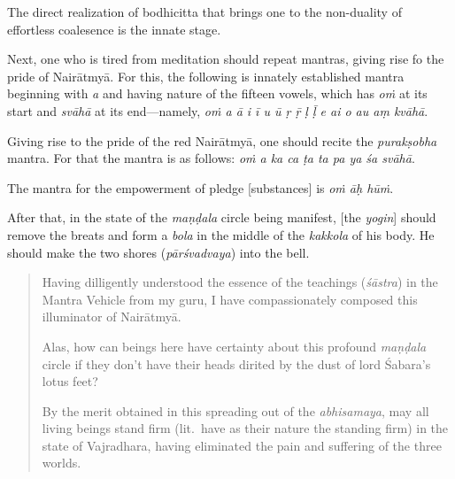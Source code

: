 \documentclass[naipra.tex]{subfiles}
\begin{document}
The direct realization of bodhicitta that brings one to the non-duality of effortless coalesence is the innate stage. 

Next, one who is tired from meditation should repeat mantras, giving rise fo the pride of Nairātmyā.
For this, the following is innately established mantra beginning with \emph{a} and having nature of the fifteen vowels, which has \emph{oṁ} at its start and \emph{svāhā} at its end—namely, \emph{oṁ a ā i ī u ū ṛ ṝ ḷ ḹ e ai o au aṃ kvāhā}.

Giving rise to the pride of the red Nairātmyā, one should recite the \emph{purakṣobha} mantra.
For that the mantra is as follows: \emph{oṁ a ka ca ṭa ta pa ya śa svāhā}.

The mantra for the empowerment of pledge [substances] is \emph{oṁ āḥ hūṁ}.

After that, in the state of the \emph{maṇḍala} circle being manifest, [the \emph{yogin}] should remove the breats and form a \emph{bola} in the middle of the \emph{kakkola} of his body.
He should make the two shores (\emph{pārśvadvaya}) into the bell.

\begin{quote}
	Having dilligently understood the essence of the teachings (\emph{śāstra}) in the Mantra Vehicle from my guru, I have compassionately composed this illuminator of Nairātmyā.

	Alas, how can beings here have certainty about this profound \emph{maṇḍala} circle if they don't have their heads dirited by the dust of lord Śabara's lotus feet?

	By the merit obtained in this spreading out of the \emph{abhisamaya}, may all living beings stand firm (lit.\ have as their nature the standing firm) in the state of Vajradhara, having eliminated the pain and suffering of the three worlds. 
\end{quote}
\end{document}
